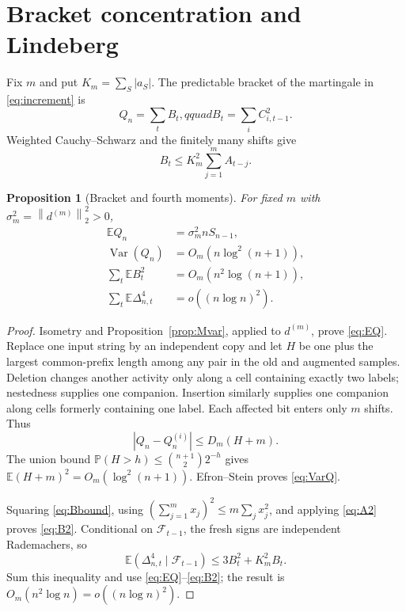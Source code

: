 \documentclass[11pt]{article}
\numberwithin{equation}{section}
\newtheorem{proposition}[theorem]{Proposition}
\theoremstyle{definition}\newtheorem{definition}[theorem]{Definition}
\theoremstyle{remark}\newtheorem{remark}[theorem]{Remark}
\newcommand{\E}{\mathbb E}\newcommand{\Pp}{\mathbb P}
\newcommand{\Var}{\operatorname {Var}}\newcommand{\Cov}{\operatorname {Cov}}
\newcommand{\1}{\mathbf 1}\newcommand{\cD}{\mathcal D}
\newcommand{\cF}{\mathcal F}\newcommand{\cG}{\mathcal G}
\newcommand{\norm}[1]{\left\lVert#1\right\rVert}
\begin{document}
\clearpage
\section{Bracket concentration and Lindeberg}\label{sec:bracket}
Fix $m$ and put $K_m=\sum_S|a_S|$.  The predictable bracket of the
martingale in \eqref{eq:increment} is
\begin{equation}Q_n=\sum_tB_t,qquad B_t=\sum_iC_{i,t-1}^2.      \label{eq:bracket}
\end{equation}
Weighted Cauchy--Schwarz and the finitely many shifts give
\begin{equation}B_t\le K_m^2\sum_{j=1}^mA_{t-j}.                \label{eq:Bbound}
\end{equation}

\begin{proposition}[Bracket and fourth moments]\label{prop:bracket}
For fixed $m$ with $\sigma_m^2=\norm{d^{(m)}}_2^2>0$,
\begin{align}
 \E Q_n&=\sigma_m^2nS_{n-1},                                  \label{eq:EQ}\\
 \Var(Q_n)&=O_m(n\log^2(n+1)),                                \label{eq:VarQ}\\
 \sum_t\E B_t^2&=O_m(n^2\log(n+1)),                           \label{eq:B2}\\
 \sum_t\E\Delta_{n,t}^4&=o((n\log n)^2).                     \label{eq:D4}
\end{align}
\end{proposition}
\begin{proof}
Isometry and Proposition~\ref{prop:Mvar}, applied to $d^{(m)}$, prove
\eqref{eq:EQ}.  Replace one input string by an independent copy and let
$H$ be one plus the largest common-prefix length among any pair in the old
and augmented samples.  Deletion changes another activity only along a
cell containing exactly two labels; nestedness supplies one companion.
Insertion similarly supplies one companion along cells formerly containing
one label.  Each affected bit enters only $m$ shifts.  Thus
\begin{equation}|Q_n-Q_n^{(i)}|\le D_m(H+m).                    \label{eq:influence}
\end{equation}
The union bound $\Pp(H>h)\le{n+1\choose2}2^{-h}$ gives
$\E(H+m)^2=O_m(\log^2(n+1))$.  Efron--Stein proves \eqref{eq:VarQ}.

Squaring \eqref{eq:Bbound}, using $(\sum_{j=1}^mx_j)^2\le
m\sum_jx_j^2$, and applying \eqref{eq:A2} proves \eqref{eq:B2}.  Conditional
on $\cF_{t-1}$, the fresh signs are independent Rademachers, so
\begin{equation}\E(\Delta_{n,t}^4\mid\cF_{t-1})
 \le3B_t^2+K_m^2B_t.                                         \label{eq:Rademacher4}
\end{equation}
Sum this inequality and use \eqref{eq:EQ}--\eqref{eq:B2}; the result is
$O_m(n^2\log n)=o((n\log n)^2)$.
\end{proof}
\end{document}
